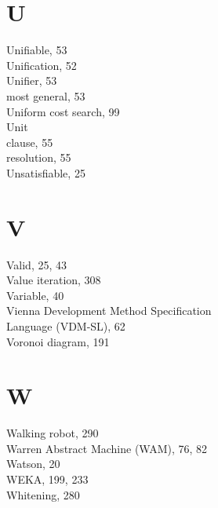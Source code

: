 \documentclass[10pt]{book}
\begin{document}
\section*{U}
Unifiable, 53\\
Unification, 52\\
Unifier, 53\\
most general, 53\\
Uniform cost search, 99\\
Unit\\
clause, 55\\
resolution, 55\\
Unsatisfiable, 25

\section*{V}
Valid, 25, 43\\
Value iteration, 308\\
Variable, 40\\
Vienna Development Method Specification\\
Language (VDM-SL), 62\\
Voronoi diagram, 191

\section*{W}
Walking robot, 290\\
Warren Abstract Machine (WAM), 76, 82\\
Watson, 20\\
WEKA, 199, 233\\
Whitening, 280





\1
\end{document}
